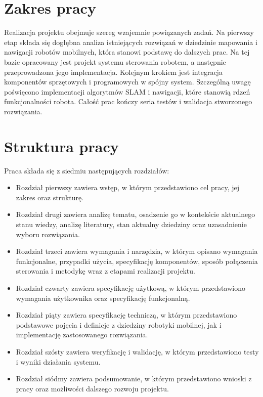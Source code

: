 \documentclass[a4paper,twoside,12pt]{book}
\begin{document}
\section{Zakres pracy}
Realizacja projektu obejmuje szereg wzajemnie powiązanych zadań. Na pierwszy etap składa się dogłębna analiza istniejących rozwiązań w dziedzinie mapowania i nawigacji robotów mobilnych, która stanowi podstawę do dalszych prac. Na tej bazie opracowany jest projekt systemu sterowania robotem, a następnie przeprowadzona jego implementacja. Kolejnym krokiem jest integracja komponentów sprzętowych i programowych w spójny system. Szczególną uwagę poświęcono implementacji algorytmów SLAM i nawigacji, które stanowią rdzeń funkcjonalności robota. Całość prac kończy seria testów i walidacja stworzonego rozwiązania.



\section{Struktura pracy}
Praca składa się z siedmiu następujących rozdziałów:
\begin{itemize}
\item Rozdział pierwszy zawiera wstęp, w którym przedstawiono cel pracy, jej zakres oraz strukturę.
\item Rozdział drugi zawiera analizę tematu, osadzenie go w kontekście aktualnego stanu wiedzy, analizę literatury, stan aktualny dziedziny oraz uzasadnienie wyboru rozwiązania.
\item Rozdział trzeci zawiera wymagania i narzędzia, w którym opisano wymagania funkcjonalne, przypadki użycia, specyfikację komponentów, sposób połączenia sterowania i metodykę wraz z etapami realizacji projektu.
\item Rozdział czwarty zawiera specyfikację użytkową, w którym przedstawiono wymagania użytkownika oraz specyfikację funkcjonalną.
\item Rozdział piąty zawiera specyfikację techniczą, w którym przedstawiono podstawowe pojęcia i definicje z dziedziny robotyki mobilnej, jak i implementację zastosowanego rozwiązania.
\item Rozdział szósty zawiera weryfikację i walidację, w którym przedstawiono testy i wyniki działania systemu.
\item Rozdział siódmy zawiera podsumowanie, w którym przedstawiono wnioski z pracy oraz możliwości dalszego rozwoju projektu.
\end{itemize}
\end{document}
